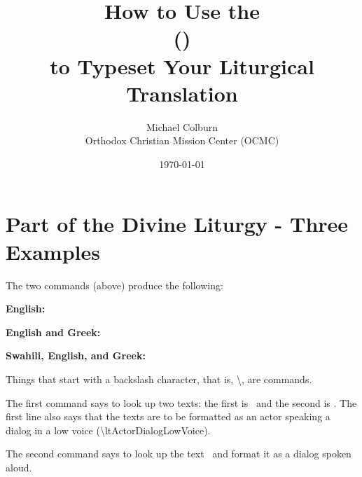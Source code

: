 \documentclass[]{memoir}
\title{How to Use the\\\ltOcmcSystem  (\ltOcmcSystemAcronymn)\\ to Typeset Your Liturgical Translation}
\author{Michael Colburn\\Orthodox Christian Mission Center (OCMC)}
\date{\today}
\newenvironment{ltDocBlock}{
\color{blue}\verbatim
}
{ 
\endverbatim
\color{black}
}
\begin{document}
\maketitle
\tableofcontents

\vfill

\pagebreak

\chapter{Part of the Divine Liturgy - Three Examples}
\begin{ltDocBlock}

\end{ltDocBlock}

The two commands (above) produce the following:
\small

\textbf{English:}



\ltColumnsOn
\textbf{English and Greek:}



\ltColumnsOn
\textbf{Swahili, English, and Greek:}



\ltColumnsOff
\normalsize
Things that start with a backslash character, that is, \textbackslash, are commands. 

The first command says to look up two texts: the first is \ and the second is .  The first line also says that the texts are to be formatted as an actor speaking a dialog in a low voice (\textbackslash ltActorDialogLowVoice).

The second command says to look up the text \ and format it as a dialog spoken aloud.
\end{document}
